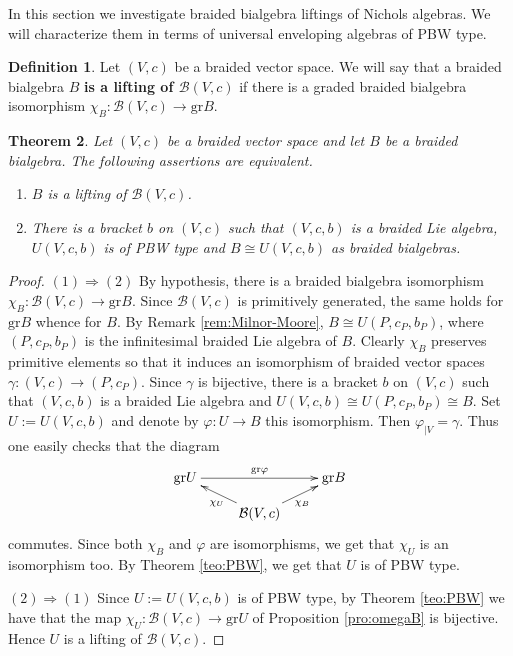 \documentclass[english]{amsart}
\numberwithin{equation}{section}
\numberwithin{figure}{section}
\theoremstyle{plain}
\newtheorem{thm}{Theorem}[section]
\theoremstyle{definition}
\newtheorem{defn}[thm]{Definition}
\theoremstyle{definition}
\theoremstyle{remark}
\theoremstyle{remark}
\theoremstyle{plain}
\theoremstyle{plain}
\theoremstyle{plain}
\begin{document}
In this section we investigate braided bialgebra liftings of Nichols
algebras. We will characterize them in terms of universal enveloping
algebras of PBW type.
\begin{defn}
Let $\left(V,c\right)$ be a braided vector space. We will say that
a braided bialgebra $B$ \textbf{is a lifting of $\mathcal{B}\left(V,c\right)$}
if there is a graded braided bialgebra isomorphism $\chi_{B}:\mathcal{B}\left(V,c\right)\rightarrow\mathrm{gr}B$. \end{defn}
\begin{thm}
\label{thm:Lifting}Let $\left(V,c\right)$ be a braided vector space
and let $B$ be a braided bialgebra. The following assertions are
equivalent.
\begin{enumerate}
\item $B$ is a lifting of $\mathcal{B}\left(V,c\right)$.
\item There is a bracket $b$ on $(V,c)$ such that $(V,c,b)$ is a braided
Lie algebra, $U(V,c,b)$ is of PBW type and $B\cong U(V,c,b)$ as
braided bialgebras.
\end{enumerate}
\end{thm}
\begin{proof}
$(1)\Rightarrow\left(2\right)$ By hypothesis, there is a braided
bialgebra isomorphism $\chi_{B}:\mathcal{B}\left(V,c\right)\rightarrow\mathrm{gr}B$.
Since $\mathcal{B}\left(V,c\right)$ is primitively generated, the
same holds for $\mathrm{gr}B$ whence for $B$. By Remark \ref{rem:Milnor-Moore},
$B\cong U\left(P,c_{P},b_{P}\right)$, where $\left(P,c_{P},b_{P}\right)$
is the infinitesimal braided Lie algebra of $B$. Clearly $\chi_{B}$
preserves primitive elements so that it induces an isomorphism of
braided vector spaces $\gamma:\left(V,c\right)\rightarrow\left(P,c_{P}\right)$.
Since $\gamma$ is bijective, there is a bracket $b$ on $\left(V,c\right)$
such that $\left(V,c,b\right)$ is a braided Lie algebra and $U\left(V,c,b\right)\cong U\left(P,c_{P},b_{P}\right)\cong B$.
Set $U:=U\left(V,c,b\right)$ and denote by $\varphi:U\rightarrow B$
this isomorphism. Then $\varphi_{\mid V}=\gamma$. Thus one easily
checks that the diagram\[
\xymatrix@R=10pt{\mathrm{gr}U\ar[rr]^{\mathrm{gr}\varphi} &  & \mathrm{gr}B\\
 & \mathcal{B}(V,c)\ar[ul]^{\chi_{U}}\ar[ur]_{\chi_{B}}}
\]
commutes. Since both $\chi_{B}$ and $\varphi$ are isomorphisms,
we get that $\chi_{U}$ is an isomorphism too. By Theorem \ref{teo:PBW},
we get that $U$ is of PBW type.

$(2)\Rightarrow\left(1\right)$ Since $U:=U\left(V,c,b\right)$ is
of PBW type, by Theorem \ref{teo:PBW} we have that the map $\chi_{U}:\mathcal{B}\left(V,c\right)\rightarrow\mathrm{gr}U$
of Proposition \ref{pro:omegaB} is bijective. Hence $U$ is a lifting
of $\mathcal{B}\left(V,c\right)$.
\end{proof}
\end{document}
